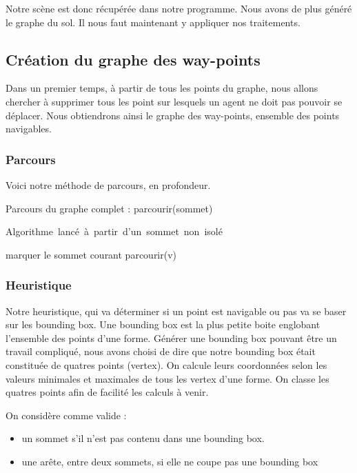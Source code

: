 \documentclass[a4paper,12pt]{report}
\begin{document}
Notre scène est donc récupérée dans notre programme. Nous avons de plus généré le graphe du sol. Il nous faut maintenant y appliquer nos traitements.

\subsection{Création du graphe des way-points}

Dans un premier temps, à partir de tous les points du graphe, nous allons chercher à supprimer tous les point sur lesquels un agent ne doit pas pouvoir se déplacer. Nous obtiendrons ainsi le graphe des way-points, ensemble des points navigables.

\subsubsection{Parcours}

Voici notre méthode de parcours, en profondeur. 

\begin{algorithm}[h]
\caption{Parcours du graphe complet : parcourir(sommet)}
\label{parcours_graphe}
\mbox{Algorithme lancé à partir d'un sommet non isolé}
\begin{algorithmic}[1]
  \STATE marquer le sommet courant
    \STATE parcourir(v)
  \ENDFOR
\ENDIF
\end{algorithmic}
\end{algorithm}

\subsubsection{Heuristique}

Notre heuristique, qui va déterminer si un point est navigable ou pas va se baser sur les bounding box. Une bounding box est la plus petite boite englobant l'ensemble des points d'une forme. Générer une bounding box pouvant être un travail compliqué, nous avons choisi de dire que notre bounding box était constituée de quatres points (vertex). On calcule leurs coordonnées selon les valeurs minimales et maximales de tous les vertex d'une forme. On classe les quatres points afin de facilité les calculs à venir.

On considère comme valide :
\begin{itemize}
 \item un sommet s'il n'est pas contenu dans une bounding box. 
 \item une arête, entre deux sommets, si elle ne coupe pas une bounding box
\end{itemize}
\end{document}
